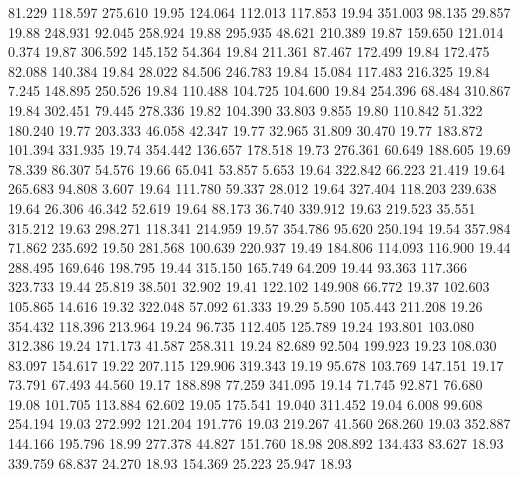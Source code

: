   81.229  118.597  275.610        19.95
 124.064  112.013  117.853        19.94
 351.003   98.135   29.857        19.88
 248.931   92.045  258.924        19.88
 295.935   48.621  210.389        19.87
 159.650  121.014    0.374        19.87
 306.592  145.152   54.364        19.84
 211.361   87.467  172.499        19.84
 172.475   82.088  140.384        19.84
  28.022   84.506  246.783        19.84
  15.084  117.483  216.325        19.84
   7.245  148.895  250.526        19.84
 110.488  104.725  104.600        19.84
 254.396   68.484  310.867        19.84
 302.451   79.445  278.336        19.82
 104.390   33.803    9.855        19.80
 110.842   51.322  180.240        19.77
 203.333   46.058   42.347        19.77
  32.965   31.809   30.470        19.77
 183.872  101.394  331.935        19.74
 354.442  136.657  178.518        19.73
 276.361   60.649  188.605        19.69
  78.339   86.307   54.576        19.66
  65.041   53.857    5.653        19.64
 322.842   66.223   21.419        19.64
 265.683   94.808    3.607        19.64
 111.780   59.337   28.012        19.64
 327.404  118.203  239.638        19.64
  26.306   46.342   52.619        19.64
  88.173   36.740  339.912        19.63
 219.523   35.551  315.212        19.63
 298.271  118.341  214.959        19.57
 354.786   95.620  250.194        19.54
 357.984   71.862  235.692        19.50
 281.568  100.639  220.937        19.49
 184.806  114.093  116.900        19.44
 288.495  169.646  198.795        19.44
 315.150  165.749   64.209        19.44
  93.363  117.366  323.733        19.44
  25.819   38.501   32.902        19.41
 122.102  149.908   66.772        19.37
 102.603  105.865   14.616        19.32
 322.048   57.092   61.333        19.29
   5.590  105.443  211.208        19.26
 354.432  118.396  213.964        19.24
  96.735  112.405  125.789        19.24
 193.801  103.080  312.386        19.24
 171.173   41.587  258.311        19.24
  82.689   92.504  199.923        19.23
 108.030   83.097  154.617        19.22
 207.115  129.906  319.343        19.19
  95.678  103.769  147.151        19.17
  73.791   67.493   44.560        19.17
 188.898   77.259  341.095        19.14
  71.745   92.871   76.680        19.08
 101.705  113.884   62.602        19.05
 175.541   19.040  311.452        19.04
   6.008   99.608  254.194        19.03
 272.992  121.204  191.776        19.03
 219.267   41.560  268.260        19.03
 352.887  144.166  195.796        18.99
 277.378   44.827  151.760        18.98
 208.892  134.433   83.627        18.93
 339.759   68.837   24.270        18.93
 154.369   25.223   25.947        18.93

